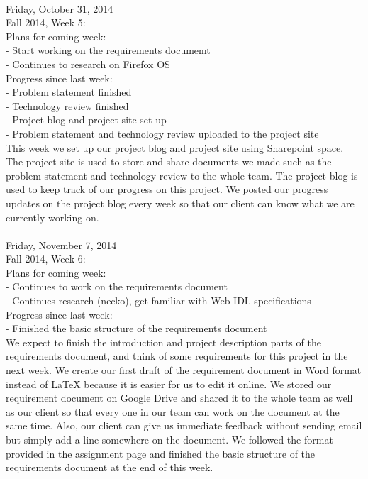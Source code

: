 {\setlength{\parindent}{0cm}
\hrulefill \\
Friday, October 31, 2014 \\
Fall 2014, Week 5: \\

Plans for coming week: \\
- Start working on the requirements documemt \\
- Continues to research on Firefox OS \\

Progress since last week: \\
- Problem statement finished \\
- Technology review finished \\
- Project blog and project site set up \\
- Problem statement and technology review uploaded to the project site \\

This week we set up our project blog and project site using Sharepoint space. The project site is used to store and share documents we made such as the problem statement and technology review to the whole team. The project blog is used to keep track of our progress on this project. We posted our progress updates on the project blog every week so that our client can know what we are currently working on. \\

\hrulefill \\
Friday, November 7, 2014 \\
Fall 2014, Week 6: \\

Plans for coming week: \\
- Continues to work on the requirements document \\
- Continues research (necko), get familiar with Web IDL specifications \\

Progress since last week: \\
- Finished the basic structure of the requirements document \\

We expect to finish the introduction and project description parts of the requirements document, and think of some requirements for this project in the next week. We create our first draft of the requirement document in Word format instead of LaTeX because it is easier for us to edit it online. We stored our requirement document on Google Drive and shared it to the whole team as well as our client so that every one in our team can work on the document at the same time. Also, our client can give us immediate feedback without sending email but simply add a line somewhere on the document. We followed the format provided in the assignment page and finished the basic structure of the requirements document at the end of this week. \\

}
